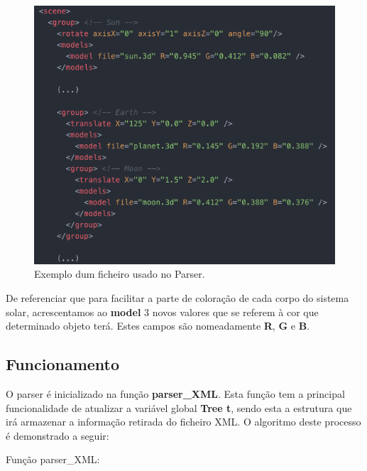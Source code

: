 \documentclass[a4paper]{article}
\begin{document}
\begin{figure}[H]
\centering
\includegraphics[scale=0.6]{ficheiro_parser.png}
\caption{Exemplo dum ficheiro usado no Parser.}
\label{img:ficheiro_parser}
\end{figure}

De referenciar que para facilitar a parte de coloração de cada corpo do sistema solar, acrescentamos ao \textbf{model} 3 novos valores que se referem à cor que determinado objeto terá. Estes campos são nomeadamente \textbf{R}, \textbf{G} e \textbf{B}.

\subsection{Funcionamento}
\label{sec:funcionamento}

O parser é inicializado na função \textbf{parser\_XML}. Esta função tem a principal funcionalidade de atualizar a variável global \textbf{Tree t}, sendo esta a estrutura que irá armazenar a informação retirada do ficheiro XML. O algoritmo deste processo é demonstrado a seguir:

    \vspace{0.5cm}

  Função parser\_XML:

    \vspace{0.1cm}
\end{document}
